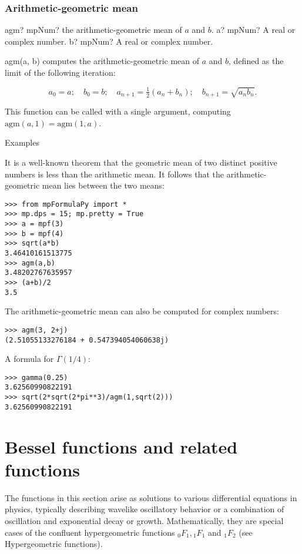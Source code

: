 \subsection{Arithmetic-geometric mean}

\begin{mpFunctionsExtract}
	\mpFunctionTwo
	{agm? mpNum? the arithmetic-geometric mean of $a$ and $b$.}
	{a? mpNum? A real or complex number.}
	{b? mpNum? A real or complex number.}	
\end{mpFunctionsExtract}

\vpara
agm(a, b) computes the arithmetic-geometric mean of $a$ and $b$, defined as the limit of the following iteration:

\begin{equation}
	a_0=a; \quad b_0=b; \quad a_{n+1}= \tfrac{1}{2}(a_n + b_n); \quad b_{n+1}=\sqrt{a_n b_n}.
\end{equation}


This function can be called with a single argument, computing $\text{agm}(a, 1)=\text{agm}(1, a)$.

\vpara
Examples

It is a well-known theorem that the geometric mean of two distinct positive numbers is less than the arithmetic mean. It follows that the arithmetic-geometric mean lies between the two means:

\begin{lstlisting}
>>> from mpFormulaPy import *
>>> mp.dps = 15; mp.pretty = True
>>> a = mpf(3)
>>> b = mpf(4)
>>> sqrt(a*b)
3.46410161513775
>>> agm(a,b)
3.48202767635957
>>> (a+b)/2
3.5
\end{lstlisting}

The arithmetic-geometric mean can also be computed for complex numbers:

\begin{lstlisting}
>>> agm(3, 2+j)
(2.51055133276184 + 0.547394054060638j)
\end{lstlisting}

A formula for $\Gamma(1/4)$:
\begin{lstlisting}
>>> gamma(0.25)
3.62560990822191
>>> sqrt(2*sqrt(2*pi**3)/agm(1,sqrt(2)))
3.62560990822191
\end{lstlisting}





\newpage
\chapter{Bessel functions and related functions}
The functions in this section arise as solutions to various differential equations in physics, typically describing wavelike oscillatory behavior or a combination of oscillation and exponential decay or growth. Mathematically, they are special cases of the confluent hypergeometric functions ${}_0F_1, {}_1F_1$ and ${}_1F_2$ (see Hypergeometric functions).



